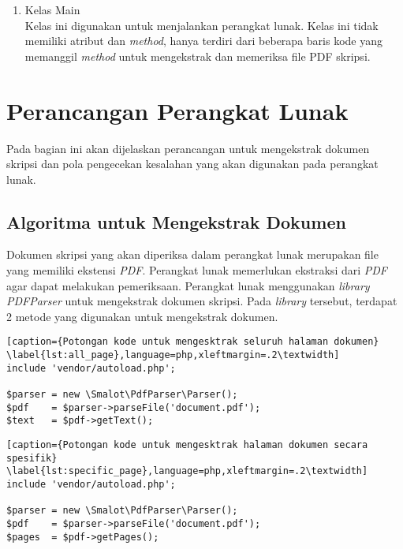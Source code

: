 \begin{enumerate}
\begin{itemize}
			\item getListPage() \\
			Method ini berfungsi untuk mendapatkan halaman daftar isi, daftar gambar, daftar tabel dan daftar referensi.
			
			\item getContent() \\
			Method ini berfungsi untuk mendapatkan halaman konten skripsi dari bab 1 sampai bab 6.
			
		\end{itemize}
	
	\item Kelas Main \\
	Kelas ini digunakan untuk menjalankan perangkat lunak. Kelas ini tidak memiliki atribut dan \textit{method}, hanya terdiri dari beberapa baris kode yang memanggil \textit{method} untuk mengekstrak dan memeriksa file PDF skripsi. 

\end{enumerate} 

\section{Perancangan Perangkat Lunak}
Pada bagian ini akan dijelaskan perancangan untuk mengekstrak dokumen skripsi dan pola pengecekan kesalahan yang akan digunakan pada perangkat lunak.
 
\subsection{Algoritma untuk Mengekstrak Dokumen}
Dokumen skripsi yang akan diperiksa dalam perangkat lunak merupakan file yang memiliki ekstensi \textit{PDF}. Perangkat lunak memerlukan ekstraksi dari \textit{PDF} agar dapat melakukan pemeriksaan. Perangkat lunak menggunakan \textit{library PDFParser} untuk mengekstrak dokumen skripsi. Pada \textit{library} tersebut, terdapat 2 metode yang digunakan untuk mengekstrak dokumen.
	
\begin{lstlisting}[caption={Potongan kode untuk mengesktrak seluruh halaman dokumen}	\label{lst:all_page},language=php,xleftmargin=.2\textwidth] 
include 'vendor/autoload.php';
	
$parser = new \Smalot\PdfParser\Parser();
$pdf    = $parser->parseFile('document.pdf');
$text   = $pdf->getText();
\end{lstlisting}
	
\begin{lstlisting}[caption={Potongan kode untuk mengesktrak halaman dokumen secara spesifik}
\label{lst:specific_page},language=php,xleftmargin=.2\textwidth] 
include 'vendor/autoload.php';

$parser = new \Smalot\PdfParser\Parser();
$pdf    = $parser->parseFile('document.pdf');
$pages  = $pdf->getPages();
\end{lstlisting}

